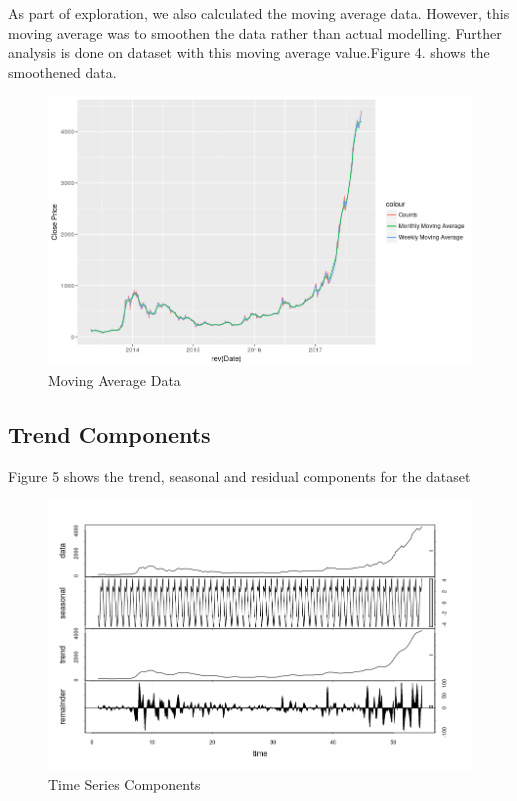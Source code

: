 \documentclass{article}
\begin{document}
As part of exploration, we also calculated the moving average data. However, this moving average was to smoothen the data rather than actual modelling.
Further analysis is done on dataset with this moving average value.\linebreak Figure 4. shows the smoothened data.

\begin{figure}[ht]
	\centering
	\includegraphics[scale=0.30]{images/ts_images/MovingWeeklyAverage.png}
	\caption{Moving Average Data}
	\label{fig:Moving Average Data}
\end{figure}

\subsection{Trend Components}
Figure 5 shows the trend, seasonal and residual components for the dataset

\begin{figure}[ht]
	\centering
	\includegraphics[scale=0.25]{images/ts_images/TimeSeriesComponents.png}
	\caption{Time Series Components}
	\label{fig:Time Series Components}
\end{figure}
\end{document}
